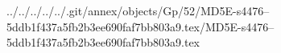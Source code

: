 ../../../../../.git/annex/objects/Gp/52/MD5E-s4476--5ddb1f437a5fb2b3ee690faf7bb803a9.tex/MD5E-s4476--5ddb1f437a5fb2b3ee690faf7bb803a9.tex